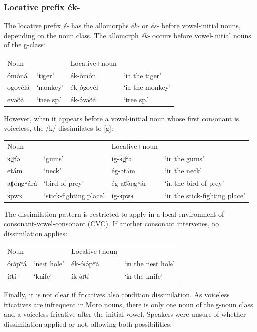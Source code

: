 \subsubsection{Locative prefix ék-}
The locative prefix \textit{é-} has the allomorphs \textit{ék-} or \textit{és-} before vowel-initial nouns, depending on the noun class. The allomorph \textit{ék-} occurs before vowel-initial nouns of the g-class:

\ea
\begin{tabular}[t]{llll}
	Noun	&&	Locative+noun\\
	ómóná 	&	‘tiger’		&	ék-ómón		&	‘in the tiger’	\\
	ogovélá	&	‘monkey’		&	ék-ógovél	&	‘in the monkey’\\
	evəðá	&	‘tree sp.’&		ék-ə́vəðá		&	‘tree sp.’\\
\end{tabular}
\z

However, when it appears before a vowel-initial noun whose first consonant is voiceless, the /k/ dissimilates to [g]:

\ea
\begin{tabular}[t]{llll}
	Noun	&&	Locative+noun\\
	ɜ́t̪ŕíə	&	‘gums’	&	íg-ɜ́t̪ŕíə	&	‘in the gums’	\\
 	etám	&	‘neck’	&	ég-ətám		&	‘in the neck’\\
	aʧóŋgʷárá&	‘bird of prey’	&	ég-aʧóŋgʷár	&‘in the bird of prey’\\
	ɜ́pwɜ	&	‘stick-fighting place’	&	íg-ɜ́pwɜ	&	‘in the stick-fighting place’\\
\end{tabular}
\z

The dissimilation pattern is restricted to apply in a local environment of consonant-vowel-consonant (CVC). If another consonant intervenes, no dissimilation applies:

\ea
\begin{tabular}[t]{llll}
	Noun	&&	Locative+noun\\
	óɾə́pʷá	&	‘nest hole’	&	ék-óɾə́pʷá	&‘in the nest hole’\\
	íɾtí	&	‘knife’		&	ík-ə́ɾtí		&‘in the knife’\\
\end{tabular}
\z

Finally, it is not clear if fricatives also condition dissimilation. As voiceless fricatives are infrequent in Moro nouns, there is only one noun of the g-noun class and a voiceless fricative after the initial vowel. Speakers were unsure of whether dissimilation applied or not, allowing both possibilities:

